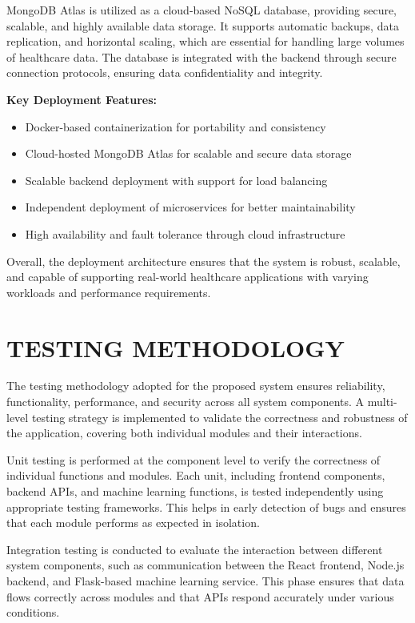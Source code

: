 \documentclass[conference]{IEEEtran}
\begin{document}
MongoDB Atlas is utilized as a cloud-based NoSQL database, providing secure, scalable, and highly available data storage. It supports automatic backups, data replication, and horizontal scaling, which are essential for handling large volumes of healthcare data. The database is integrated with the backend through secure connection protocols, ensuring data confidentiality and integrity.

\textbf{Key Deployment Features:}
\begin{itemize}
\item Docker-based containerization for portability and consistency
\item Cloud-hosted MongoDB Atlas for scalable and secure data storage
\item Scalable backend deployment with support for load balancing
\item Independent deployment of microservices for better maintainability
\item High availability and fault tolerance through cloud infrastructure
\end{itemize}

Overall, the deployment architecture ensures that the system is robust, scalable, and capable of supporting real-world healthcare applications with varying workloads and performance requirements.
 
\section{TESTING METHODOLOGY}

The testing methodology adopted for the proposed system ensures reliability, functionality, performance, and security across all system components. A multi-level testing strategy is implemented to validate the correctness and robustness of the application, covering both individual modules and their interactions.

Unit testing is performed at the component level to verify the correctness of individual functions and modules. Each unit, including frontend components, backend APIs, and machine learning functions, is tested independently using appropriate testing frameworks. This helps in early detection of bugs and ensures that each module performs as expected in isolation.

Integration testing is conducted to evaluate the interaction between different system components, such as communication between the React frontend, Node.js backend, and Flask-based machine learning service. This phase ensures that data flows correctly across modules and that APIs respond accurately under various conditions.
\end{document}

